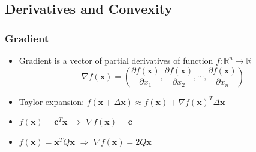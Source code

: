 \subsection{Derivatives and Convexity}

\subsubsection*{Gradient}
\begin{itemize}
    \item Gradient is a vector of partial derivatives of function $f: \mathbb{R}^n \rightarrow \mathbb{R}$
    \begin{equation}
        \nabla f(\mathbf{x}) = \left(\frac {\partial f(\mathbf{x})} {\partial x_1}, \frac {\partial f(\mathbf{x})} {\partial x_2}, \cdots, \frac {\partial f(\mathbf{x})} {\partial x_n} \right)
    \end{equation}
    \item Taylor expansion: $f(\mathbf{x} + \Delta \mathbf{x}) \approx f(\mathbf{x}) + \nabla f(\mathbf{x})^T \Delta \mathbf{x}$
    \item $f(\mathbf{x}) = \mathbf{c}^T\mathbf{x}$ $\Rightarrow$ $\nabla f(\mathbf{x}) = \mathbf{c}$
    \item $f(\mathbf{x}) = \mathbf{x}^T Q \mathbf{x}$ $\Rightarrow$ $\nabla f(\mathbf{x}) = 2Q\mathbf{x}$
\end{itemize}

